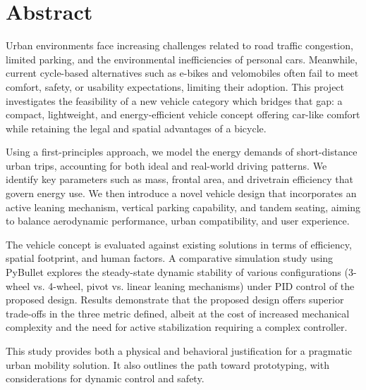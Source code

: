 \documentclass[a4paper, 11 pt]{article}
\begin{document}
{ %

\newpage
\section*{Abstract}
Urban environments face increasing challenges related to road traffic congestion, limited parking, and the environmental inefficiencies of personal cars. Meanwhile, current cycle-based alternatives such as e-bikes and velomobiles often fail to meet comfort, safety, or usability expectations, limiting their adoption. This project investigates the feasibility of a new vehicle category which bridges that gap: a compact, lightweight, and energy-efficient vehicle concept offering car-like comfort while retaining the legal and spatial advantages of a bicycle.

Using a first-principles approach, we model the energy demands of short-distance urban trips, accounting for both ideal and real-world driving patterns. We identify key parameters such as mass, frontal area, and drivetrain efficiency that govern energy use. We then introduce a novel vehicle design that incorporates an active leaning mechanism, vertical parking capability, and tandem seating, aiming to balance aerodynamic performance, urban compatibility, and user experience.

The vehicle concept is evaluated against existing solutions in terms of efficiency, spatial footprint, and human factors. A comparative simulation study using PyBullet explores the steady-state dynamic stability of various configurations (3-wheel vs. 4-wheel, pivot vs. linear leaning mechanisms) under PID control of the proposed design. Results demonstrate that the proposed design offers superior trade-offs in the three metric defined, albeit at the cost of increased mechanical complexity and the need for active stabilization requiring a complex controller.

This study provides both a physical and behavioral justification for a pragmatic urban mobility solution. It also outlines the path toward prototyping, with considerations for dynamic control and safety.

\newpage
}
\newpage
\renewcommand{\contentsname}{Table of Contents} 
{
  \hypersetup{linkcolor=black}
  \tableofcontents
}
\newpage

 











\newpage
 

\end{document}
